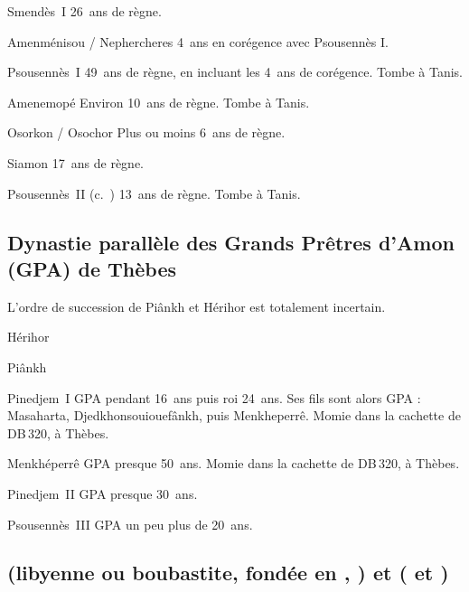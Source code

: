 \begin{listerois}
  \item [Smendès~I\ier] \num{26}~ans de règne.
  \item [Amenménisou / Nephercheres] \num{4}~ans en corégence avec 
        Psousennès I\ier.
  \item [Psousennès~I\ier] \num{49}~ans de règne, en incluant les 
        \num{4}~ans de corégence. Tombe à Tanis.
  \item [Amenemopé \datation{(c.~\anorange{993}{984})}] 
        Environ \num{10}~ans de règne. 
        Tombe à Tanis.
  \item [Osorkon / Osochor] Plus ou moins \num{6}~ans de règne.
  \item [Siamon] \num{17}~ans de règne.
  \item [Psousennès~II] (c.~) \num{13}~ans de 
        règne. Tombe à Tanis.
\end{listerois}

\subsection[Dynastie des GPA de Thèbes]{Dynastie parallèle des Grands 
            Prêtres d'Amon (GPA) de Thèbes}

L'ordre de succession de Piânkh et Hérihor est totalement incertain.

\begin{listerois}
  \item [Hérihor]
  \item [Piânkh]
  \item [Pinedjem~I\ier \datation{(c.~\anorange{1070}{1032})}] 
        GPA pendant \num{16}~ans puis roi \num{24}~ans. Ses fils sont 
        alors GPA : Masaharta, Djedkhonsouiouefânkh, puis Menkheperrê.
        Momie dans la cachette de \DeB DB\,320, à Thèbes.
  \item [Menkhéperrê \datation{(c.~\anorange{1045}{992})}] 
        GPA presque \num{50}~ans.
        Momie dans la cachette de \DeB DB\,320, à Thèbes.
  \item [Pinedjem~II] GPA presque \num{30}~ans.
  \item [Psousennès~III] GPA un peu plus de \num{20}~ans.

\end{listerois}

\subsection[\texorpdfstring{\dynlist{22}{23}}
                           {XXIIe et XXIIIe dynasties}]
           { (libyenne ou boubastite, fondée en , 
            \XIIA) et   (\XIIB{} et \XIIC)}

